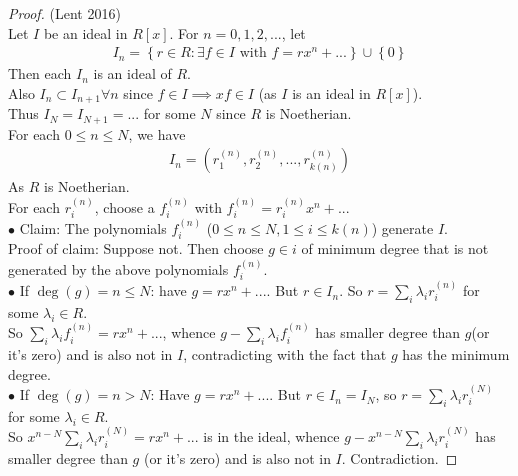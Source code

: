 \documentclass[a4paper]{article}
\begin{document}
\begin{thm}
\begin{proof} (Lent 2016)\\
Let $I$ be an ideal in $R[x]$. For $n=0,1,2,...$, let
\begin{equation*}
\begin{aligned}
I_n = \left\{r\in R:\exists f\in I \text{  with  } f=rx^n+...\right\} \cup \left\{0\right\}
\end{aligned}
\end{equation*}
Then each $I_n$ is an ideal of $R$.\\
Also $I_n \subset I_{n+1} \forall n$ since $f\in I \implies xf\in I$ (as $I$ is an ideal in $R[x]$).\\
Thus $I_N=I_{N+1}=...$ for some $N$ since $R$ is Noetherian.\\
For each $0\leq n \leq N$, we have 
\begin{equation*}
\begin{aligned}
I_n=\left(r_1^{\left(n\right)},r_2^{\left(n\right)},...,r_{k\left(n\right)}^{\left(n\right)}\right)
\end{aligned}
\end{equation*}
As $R$ is Noetherian.\\
For each $r_i^{\left(n\right)}$, choose a $f_i^{\left(n\right)}$ with $f_i^{\left(n\right)} = r_i^{\left(n\right)} x^n+ ...$\\
$\bullet$ Claim: The polynomials $f_i^{\left(n\right)}$ ($0\leq n \leq N, 1 \leq i \leq k\left(n\right)$) generate $I$.\\
Proof of claim: Suppose not. Then choose $g\in i$ of minimum degree that is not generated by the above polynomials $f_i^{\left(n\right)}$.\\
$\bullet$ If $\deg\left(g\right) = n \leq N$: have $g=r x^n+...$. But $r\in I_n$. So $r=\sum_i \lambda_i r_i^{\left(n\right)}$ for some $\lambda_i \in R$.\\
So $\sum_i \lambda_i f_i^{\left(n\right)} = rx^n+...$, whence $g-\sum_i \lambda_i f_i^{\left(n\right)}$ has smaller degree than $g$(or it's zero) and is also not in $I$, contradicting with the fact that $g$ has the minimum degree.\\
$\bullet$ If $\deg\left(g\right) = n > N$: Have $g=r x^n + ...$. But $r\in I_n = I_N$, so $r=\sum_i \lambda_i r_i^{\left(N\right)}$ for some $\lambda_i\in R$.\\
So $x^{n-N} \sum_i \lambda_i r_i^{\left(N\right)} = rx^n + ...$ is in the ideal, whence $g-x^{n-N} \sum_i \lambda_i r_i^{\left(N\right)}$ has smaller degree than $g$ (or it's zero) and is also not in $I$. Contradiction.
\end{proof}
\end{thm}
\end{document}
